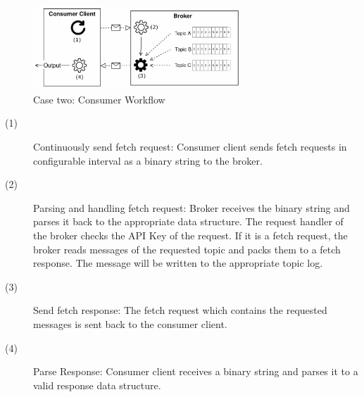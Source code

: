 \begin{figure}[H]
    \centering
   \includegraphics[width=0.7\textwidth]{images/concept_consumer.png}
    \caption{Case two: Consumer Workflow}
    \label{fig:concept-consumer}
\end{figure}

\begin{description}
    \item [(1)] 
        {Continuously send fetch request: Consumer client sends fetch
        requests in configurable interval as a binary string to the broker. } 
    \item [(2)] 
        {Parsing and handling fetch request: Broker receives the binary string
            and parses it back to the appropriate data structure. The request
            handler of the broker checks the API Key of the request. If it is a
            fetch request, the broker reads messages of the requested topic and
            packs them to a fetch response. The message will be written to the
            appropriate topic log.}
    \item [(3)] 
        {Send fetch response: The fetch request which contains the requested
        messages is sent back to the consumer client.}
    \item [(4)] 
        {Parse Response: Consumer client receives a binary string and parses it
        to a valid response data structure. }
\end{description}


